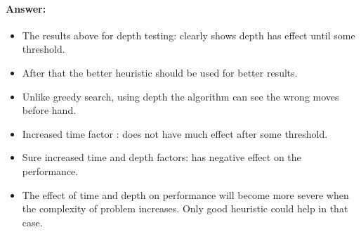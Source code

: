 \documentclass[11pt]{article}
\providecommand{\tightlist}{%
      \setlength{\itemsep}{0pt}\setlength{\parskip}{0pt}}
\begin{document}
    \hypertarget{answer}{%
\paragraph{Answer:}\label{answer}}

\begin{itemize}
\tightlist
\item
  The results above for depth testing: clearly shows depth has effect
  until some threshold.
\item
  After that the better heuristic should be used for better results.
\item
  Unlike greedy search, using depth the algorithm can see the wrong
  moves before hand.
\item
  Increased time factor : does not have much effect after some
  threshold.
\item
  Sure increased time and depth factors: has negative effect on the
  performance.
\item
  The effect of time and depth on performance will become more severe
  when the complexity of problem increases. Only good heuristic could
  help in that case.
\end{itemize}


    
    
    
    
\end{document}
